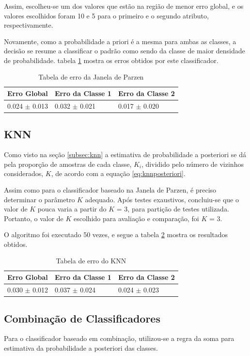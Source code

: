 Assim, escolheu-se um dos valores que estão na região de menor erro global, e os valores escolhidos foram 10 e 5 para o primeiro e o segundo atributo, respectivamente.

Novamente, como a probabilidade a priori é a mesma para ambas as classes, a decisão se resume a classificar o padrão como sendo da classe de maior densidade de probabilidade. tabela \ref{tab:erro-janela-parzen} mostra os erros obtidos por este classificador.

\begin{table}[H]
\begin{center}
\begin{tabular}{|l|l|l|}
\hline
Erro Global			&	Erro da Classe 1	&	Erro da Classe 2	\\
\hline %
0.024 $\pm$ 0.013	&	0.032 $\pm$ 0.021	&	0.017 $\pm$ 0.020	\\
\hline
\end{tabular}%
\end{center}   %
\caption{Tabela de erro da Janela de Parzen}
\label{tab:erro-janela-parzen}
\end{table}

\subsection{KNN}
\label{subsec:exp-knn}

Como visto na seção \ref{subsec:knn} a estimativa de probabilidade a posteriori se dá pela proporção de amostras de cada classe, $K_i$, dividido pelo número de vizinhos considerados, $K$, de acordo com a equação \ref{eq:knnposteriori}.

Assim como para o classificador baseado na Janela de Parzen, é preciso determinar o parâmetro $K$ adequado. Após testes exaustivos, concluiu-se que o valor de $K$ pouca varia a partir do $K$ = 3, para partição de testes utilizada. Portanto, o valor de $K$ escolhido para avaliação e comparação, foi $K$ = 3.

O algoritmo foi executado 50 vezes, e segue a tabela \ref{tab:erro-knn} mostra os resultados obtidos.

\begin{table}[H]
\begin{center}
\begin{tabular}{|l|l|l|}
\hline
Erro Global			&	Erro da Classe 1	&	Erro da Classe 2	\\
\hline %
0.030 $\pm$ 0.012	&	0.037 $\pm$ 0.024	&	0.024 $\pm$ 0.023	\\
\hline
\end{tabular}%
\end{center}   %
\caption{Tabela de erro do KNN}
\label{tab:erro-knn}
\end{table}

\subsection{Combinação de Classificadores}
\label{subsec:exp-combinacaodeclassificadores}


Para o classificador baseado em combinação, utilizou-se a regra da soma para estimativa da probabilidade a posteriori das classes.





